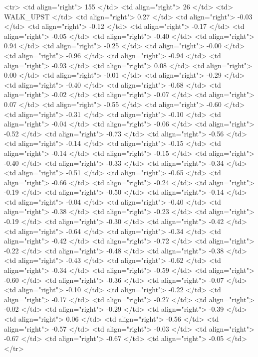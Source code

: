   <tr> <td align="right"> 155 </td> <td align="right">  26 </td> <td> WALK_UPST </td> <td align="right"> 0.27 </td> <td align="right"> -0.03 </td> <td align="right"> -0.12 </td> <td align="right"> -0.17 </td> <td align="right"> -0.05 </td> <td align="right"> -0.40 </td> <td align="right"> 0.94 </td> <td align="right"> -0.25 </td> <td align="right"> -0.00 </td> <td align="right"> -0.96 </td> <td align="right"> -0.94 </td> <td align="right"> -0.93 </td> <td align="right"> 0.08 </td> <td align="right"> 0.00 </td> <td align="right"> -0.01 </td> <td align="right"> -0.29 </td> <td align="right"> -0.40 </td> <td align="right"> -0.68 </td> <td align="right"> -0.02 </td> <td align="right"> -0.07 </td> <td align="right"> 0.07 </td> <td align="right"> -0.55 </td> <td align="right"> -0.60 </td> <td align="right"> -0.31 </td> <td align="right"> -0.10 </td> <td align="right"> -0.04 </td> <td align="right"> -0.06 </td> <td align="right"> -0.52 </td> <td align="right"> -0.73 </td> <td align="right"> -0.56 </td> <td align="right"> -0.14 </td> <td align="right"> -0.15 </td> <td align="right"> -0.14 </td> <td align="right"> -0.15 </td> <td align="right"> -0.40 </td> <td align="right"> -0.33 </td> <td align="right"> -0.34 </td> <td align="right"> -0.51 </td> <td align="right"> -0.65 </td> <td align="right"> -0.66 </td> <td align="right"> -0.24 </td> <td align="right"> -0.19 </td> <td align="right"> -0.50 </td> <td align="right"> -0.14 </td> <td align="right"> -0.04 </td> <td align="right"> -0.40 </td> <td align="right"> -0.38 </td> <td align="right"> -0.23 </td> <td align="right"> -0.19 </td> <td align="right"> -0.30 </td> <td align="right"> -0.42 </td> <td align="right"> -0.64 </td> <td align="right"> -0.34 </td> <td align="right"> -0.42 </td> <td align="right"> -0.72 </td> <td align="right"> -0.22 </td> <td align="right"> -0.48 </td> <td align="right"> -0.38 </td> <td align="right"> -0.43 </td> <td align="right"> -0.62 </td> <td align="right"> -0.34 </td> <td align="right"> -0.59 </td> <td align="right"> -0.60 </td> <td align="right"> -0.36 </td> <td align="right"> -0.07 </td> <td align="right"> -0.10 </td> <td align="right"> -0.22 </td> <td align="right"> -0.17 </td> <td align="right"> -0.27 </td> <td align="right"> -0.02 </td> <td align="right"> -0.29 </td> <td align="right"> -0.39 </td> <td align="right"> 0.06 </td> <td align="right"> -0.56 </td> <td align="right"> -0.57 </td> <td align="right"> -0.03 </td> <td align="right"> -0.67 </td> <td align="right"> -0.67 </td> <td align="right"> -0.05 </td> </tr>
